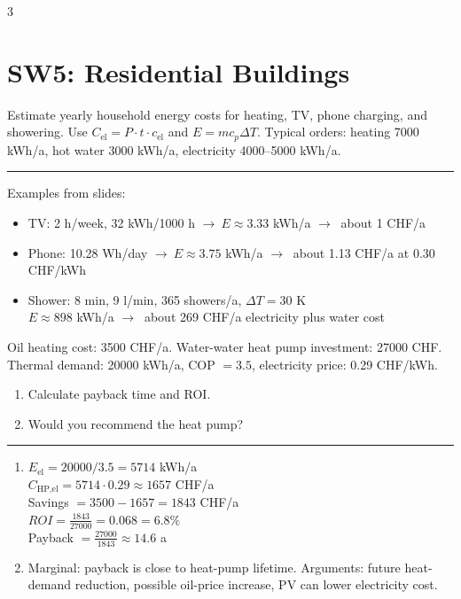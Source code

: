 \documentclass[9pt, landscape, a4paper]{article}
\let\mathto\to
\renewcommand{\to}{\ensuremath{\mathto}\ }
\newcommand{\hr}{\vspace{0.1cm}\par\vspace{-.5\ht\strutbox}\noindent\rule{\linewidth}{.5pt}\par\vspace{0.1cm}}
\begin{document}
\begin{multicols*}{3}
\section{SW5: Residential Buildings}
\begin{exercisebox}
  Estimate yearly household energy costs for heating, TV, phone charging, and showering.
  Use $C_\text{el}=P\cdot t\cdot c_\text{el}$ and $E=mc_p\Delta T$.
  Typical orders: heating 7000 kWh/a, hot water 3000 kWh/a, electricity 4000--5000 kWh/a.
  \hr
  Examples from slides:
  \begin{itemize}
    \item TV: 2 h/week, 32 kWh/1000 h $\to E\approx3.33$ kWh/a $\to$ about 1 CHF/a
    \item Phone: 10.28 Wh/day $\to E\approx3.75$ kWh/a $\to$ about 1.13 CHF/a at 0.30 CHF/kWh
    \item Shower: 8 min, 9 l/min, 365 showers/a, $\Delta T=30$ K\\
      $E\approx898$ kWh/a $\to$ about 269 CHF/a electricity plus water cost
  \end{itemize}
\end{exercisebox}

\begin{exercisebox}
  Oil heating cost: 3500 CHF/a. Water-water heat pump investment: 27000 CHF.
  Thermal demand: 20000 kWh/a, COP $=3.5$, electricity price: 0.29 CHF/kWh.
  \begin{enumerate}[label=\alph*.]
    \item Calculate payback time and ROI.
    \item Would you recommend the heat pump?
  \end{enumerate}
  \hr
  \begin{enumerate}[label=\alph*.]
    \item $E_\text{el}=20000/3.5=5714$ kWh/a\\
      $C_\text{HP,el}=5714\cdot0.29\approx1657$ CHF/a\\
      Savings $=3500-1657=1843$ CHF/a\\
      $ROI=\frac{1843}{27000}=0.068=6.8\%$\\
      Payback $=\frac{27000}{1843}\approx14.6$ a
    \item Marginal: payback is close to heat-pump lifetime. Arguments: future heat-demand reduction,
      possible oil-price increase, PV can lower electricity cost.
  \end{enumerate}
\end{exercisebox}


\end{multicols*}
\end{document}
